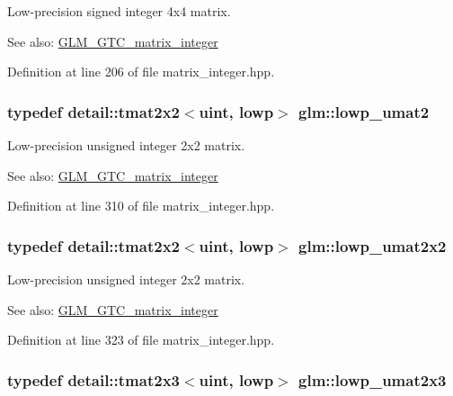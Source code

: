 Low-precision signed integer 4x4 matrix. \begin{Desc}
\item[See also:]\hyperlink{group__gtc__matrix__integer}{GLM\_\-GTC\_\-matrix\_\-integer} \end{Desc}


Definition at line 206 of file matrix\_\-integer.hpp.\hypertarget{group__gtc__matrix__integer_g09df85e6b5e53f66a86d042e0633bfbc}{
\subsubsection[lowp\_\-umat2]{\setlength{\rightskip}{0pt plus 5cm}typedef detail::tmat2x2$<$uint, lowp$>$ {\bf glm::lowp\_\-umat2}}}
\label{group__gtc__matrix__integer_g09df85e6b5e53f66a86d042e0633bfbc}


Low-precision unsigned integer 2x2 matrix. \begin{Desc}
\item[See also:]\hyperlink{group__gtc__matrix__integer}{GLM\_\-GTC\_\-matrix\_\-integer} \end{Desc}


Definition at line 310 of file matrix\_\-integer.hpp.\hypertarget{group__gtc__matrix__integer_ga4dfe67706187e459004b9a6c500b048}{
\subsubsection[lowp\_\-umat2x2]{\setlength{\rightskip}{0pt plus 5cm}typedef detail::tmat2x2$<$uint, lowp$>$ {\bf glm::lowp\_\-umat2x2}}}
\label{group__gtc__matrix__integer_ga4dfe67706187e459004b9a6c500b048}


Low-precision unsigned integer 2x2 matrix. \begin{Desc}
\item[See also:]\hyperlink{group__gtc__matrix__integer}{GLM\_\-GTC\_\-matrix\_\-integer} \end{Desc}


Definition at line 323 of file matrix\_\-integer.hpp.\hypertarget{group__gtc__matrix__integer_g4c8388c4a03f228c0e12dd7b7445115d}{
\subsubsection[lowp\_\-umat2x3]{\setlength{\rightskip}{0pt plus 5cm}typedef detail::tmat2x3$<$uint, lowp$>$ {\bf glm::lowp\_\-umat2x3}}}
\label{group__gtc__matrix__integer_g4c8388c4a03f228c0e12dd7b7445115d}


